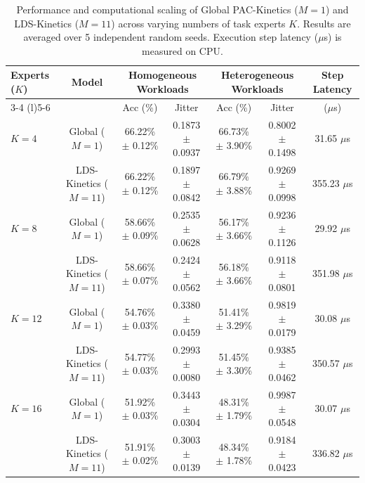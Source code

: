 \begin{table}[t]
\caption{Performance and computational scaling of Global PAC-Kinetics ($M=1$) and LDS-Kinetics ($M=11$) across varying numbers of task experts $K$. Results are averaged over 5 independent random seeds. Execution step latency ($\mu$s) is measured on CPU.}
\label{tab:scaling_experts}
\vskip 0.15in
\begin{center}
\begin{small}
\begin{sc}
\setlength{\tabcolsep}{1.8pt}
\begin{tabular}{lcccccc}
\toprule
Experts ($K$) & Model & \multicolumn{2}{c}{Homogeneous Workloads} & \multicolumn{2}{c}{Heterogeneous Workloads} & Step Latency \\
\cmidrule(r){3-4} \cmidrule(l){5-6}
& & Acc (\%) & Jitter & Acc (\%) & Jitter & ($\mu$s) \\
\midrule
$K=4$ & Global ($M=1$) & 66.22\% $\pm$ 0.12\% & 0.1873 $\pm$ 0.0937 & 66.73\% $\pm$ 3.90\% & 0.8002 $\pm$ 0.1498 & 31.65 $\mu$s \\
& LDS-Kinetics ($M=11$) & 66.22\% $\pm$ 0.12\% & 0.1897 $\pm$ 0.0842 & 66.79\% $\pm$ 3.88\% & 0.9269 $\pm$ 0.0998 & 355.23 $\mu$s \\
\midrule
$K=8$ & Global ($M=1$) & 58.66\% $\pm$ 0.09\% & 0.2535 $\pm$ 0.0628 & 56.17\% $\pm$ 3.66\% & 0.9236 $\pm$ 0.1126 & 29.92 $\mu$s \\
& LDS-Kinetics ($M=11$) & 58.66\% $\pm$ 0.07\% & 0.2424 $\pm$ 0.0562 & 56.18\% $\pm$ 3.66\% & 0.9118 $\pm$ 0.0801 & 351.98 $\mu$s \\
\midrule
$K=12$ & Global ($M=1$) & 54.76\% $\pm$ 0.03\% & 0.3380 $\pm$ 0.0459 & 51.41\% $\pm$ 3.29\% & 0.9819 $\pm$ 0.0179 & 30.08 $\mu$s \\
& LDS-Kinetics ($M=11$) & 54.77\% $\pm$ 0.03\% & 0.2993 $\pm$ 0.0080 & 51.45\% $\pm$ 3.30\% & 0.9385 $\pm$ 0.0462 & 350.57 $\mu$s \\
\midrule
$K=16$ & Global ($M=1$) & 51.92\% $\pm$ 0.03\% & 0.3443 $\pm$ 0.0304 & 48.31\% $\pm$ 1.79\% & 0.9987 $\pm$ 0.0548 & 30.07 $\mu$s \\
& LDS-Kinetics ($M=11$) & 51.91\% $\pm$ 0.02\% & 0.3003 $\pm$ 0.0139 & 48.34\% $\pm$ 1.78\% & 0.9184 $\pm$ 0.0423 & 336.82 $\mu$s \\
\bottomrule
\end{tabular}
\end{sc}
\end{small}
\end{center}
\end{table}

